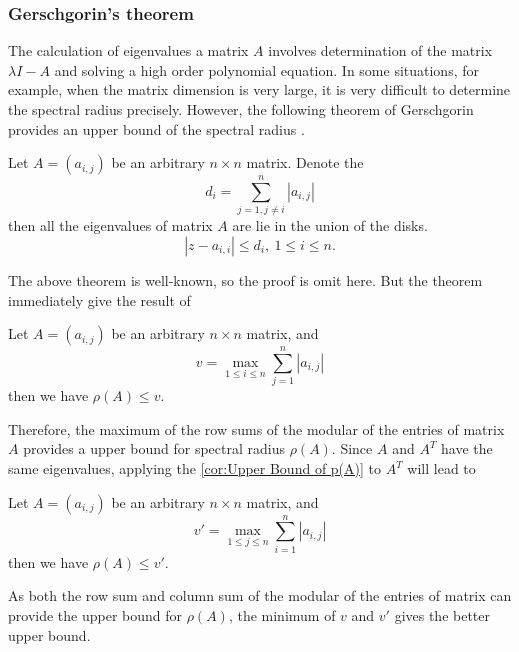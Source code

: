 \subsubsection{Gerschgorin's theorem}

The calculation of eigenvalues a matrix $A$ involves determination
of the matrix $\lambda I-A$ and solving a high order polynomial equation.
In some situations, for example, when the matrix dimension is very
large, it is very difficult to determine the spectral radius precisely.
However, the following theorem of Gerschgorin provides an upper bound
of the spectral radius \cite{Horn1990}.
\begin{thm}
Let $A=\left(a_{i,j}\right)$ be an arbitrary $n\times n$ matrix.
Denote the 
\begin{equation}
d_{i}=\sum_{j=1,j\neq i}^{n}\left|a_{i,j}\right|
\end{equation}
then all the eigenvalues of matrix $A$ are lie in the union of the
disks.
\begin{equation}
\left|z-a_{i,i}\right|\leq d_{i},\ 1\leq i\leq n.
\end{equation}

\end{thm}
The above theorem is well-known, so the proof is omit here. But the
theorem immediately give the result of
\begin{cor}
\label{cor:Upper Bound of p(A)}Let $A=\left(a_{i,j}\right)$ be an
arbitrary $n\times n$ matrix, and 
\begin{equation}
v=\max_{1\leq i\leq n}\sum_{j=1}^{n}\left|a_{i,j}\right|
\end{equation}
then we have $\rho\left(A\right)\leq v$. 
\end{cor}
Therefore, the maximum of the row sums of the modular of the entries
of matrix $A$ provides a upper bound for spectral radius $\rho\left(A\right)$.
Since $A$ and $A^{T}$ have the same eigenvalues, applying the \ref{cor:Upper Bound of p(A)}
to $A^{T}$ will lead to 
\begin{cor}
Let $A=\left(a_{i,j}\right)$ be an arbitrary $n\times n$ matrix,
and 
\begin{equation}
v'=\max_{1\leq j\leq n}\sum_{i=1}^{n}\left|a_{i,j}\right|
\end{equation}
then we have $\rho\left(A\right)\leq v'$.
\end{cor}
As both the row sum and column sum of the modular of the entries of
matrix can provide the upper bound for $\rho\left(A\right)$, the
minimum of $v$ and $v'$ gives the better upper bound. 



